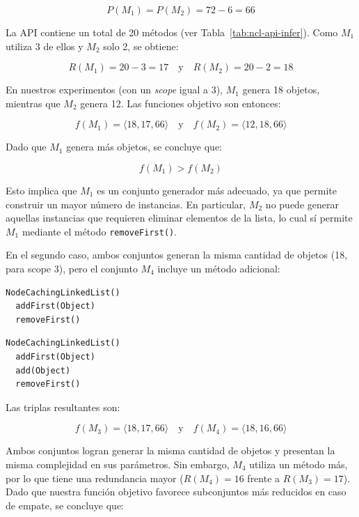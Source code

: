 \[
P(M_1) = P(M_2) = 72 - 6 = 66
\]

La API contiene un total de 20 métodos (ver Tabla~\ref{tab:ncl-api-infer}). Como \( M_1 \) utiliza 3 de ellos y \( M_2 \) solo 2, se obtiene:

\[
R(M_1) = 20 - 3 = 17 \quad \text{y} \quad R(M_2) = 20 - 2 = 18
\]

En nuestros experimentos (con un \emph{scope} igual a 3), \( M_1 \) genera 18 objetos, mientras que \( M_2 \) genera 12. Las funciones objetivo son entonces:

\[
f(M_1) = \langle 18, 17, 66 \rangle \quad \text{y} \quad f(M_2) = \langle 12, 18, 66 \rangle
\]

Dado que \( M_1 \) genera más objetos, se concluye que:

\[
f(M_1) > f(M_2)
\]

Esto implica que \( M_1 \) es un conjunto generador más adecuado, ya que permite construir un mayor número de instancias. 
En particular, \( M_2 \) no puede generar aquellas instancias que requieren eliminar elementos de la lista, lo cual sí permite \( M_1 \) mediante el método \texttt{removeFirst()}.


En el segundo caso, ambos conjuntos generan la misma cantidad de objetos (18, para scope 3), pero el conjunto \( M_4 \) incluye un método adicional:

\vspace{5pt}

\begin{lstlisting}[numbers=none,label=fig:NCLbuilders3, caption=Conjunto de métodos \( M_3 \)]
  NodeCachingLinkedList()
  addFirst(Object)
  removeFirst()
\end{lstlisting}

\begin{lstlisting}[numbers=none,label=fig:NCLbuilders4, caption=Conjunto de métodos \( M_4 \)]
  NodeCachingLinkedList()
  addFirst(Object)
  add(Object)
  removeFirst()
\end{lstlisting}

Las triplas resultantes son:

\[
f(M_3) = \langle 18, 17, 66 \rangle \quad \text{y} \quad f(M_4) = \langle 18, 16, 66 \rangle
\]

Ambos conjuntos logran generar la misma cantidad de objetos y presentan la misma complejidad en sus parámetros. Sin embargo, \( M_4 \) utiliza un método más, por lo que tiene una redundancia mayor (\( R(M_4) = 16 \) frente a \( R(M_3) = 17 \)). 
Dado que nuestra función objetivo favorece subconjuntos más reducidos en caso de empate, se concluye que:

